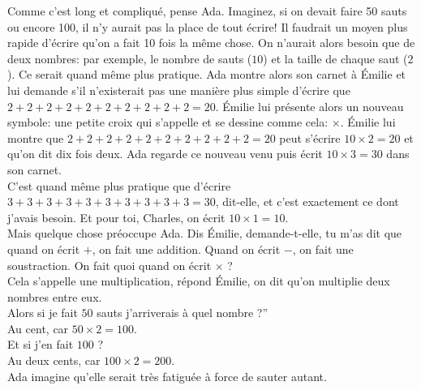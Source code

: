 Comme c’est long et compliqué, pense Ada. 
Imaginez, si on devait faire 50 sauts ou encore 100, il n’y aurait pas la place de tout écrire! 
Il faudrait un moyen plus rapide d’écrire qu'on a fait 10 fois la même chose. On n’aurait alors besoin que de deux nombres: par exemple, le nombre de sauts ($10$) et la taille de chaque saut ($2$). Ce serait quand même plus pratique. 
Ada montre alors son carnet à Émilie et lui demande s'il n’existerait pas une manière plus simple d’écrire que $2+2+2+2+2+2+2+2+2+2=20$. Émilie lui présente alors un nouveau symbole: une petite croix qui s’appelle  et se dessine comme cela: $\times$. Émilie lui montre que $2+2+2+2+2+2+2+2+2+2=20$ peut s’écrire $10 \times 2 = 20$ et qu’on dit dix fois deux.
Ada regarde ce nouveau venu puis écrit $10 \times 3 = 30$ dans son carnet. 
\\
\guillemotleft C’est quand même plus pratique que d’écrire $3+3+3+3+3+3+3+3+3+3=30$, dit-elle, et c’est exactement ce dont j’avais besoin. Et pour toi, Charles, on écrit $10 \times 1 = 10$. \guillemotright\\
Mais quelque chose préoccupe Ada. 
\guillemotleft Dis Émilie, demande-t-elle, tu m’as dit que quand on écrit $+$, on fait une addition. Quand on écrit $-$, on fait une soustraction. On fait quoi quand on écrit $\times$ ?\\
\mdash Cela s’appelle une multiplication, répond Émilie, on dit qu’on multiplie deux nombres entre eux.\\
\mdash Alors si je fait $50$ sauts j’arriverais à quel nombre ?”\\
\mdash Au cent, car $50 \times 2 = 100$.\\
\mdash Et si j’en fait $100$ ?\\
\mdash Au deux cents, car $100 \times 2 = 200$. \guillemotright\\
Ada imagine qu'elle serait très fatiguée à force de sauter autant.
